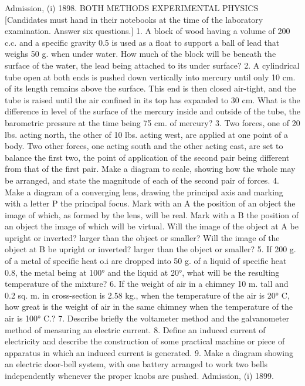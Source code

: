 Admission, (i) 1898.
BOTH METHODS EXPERIMENTAL PHYSICS
[Candidates must hand in their notebooks at the time of the laboratory examination. Answer six questions.]
1. A block of wood having a volume of 200 c.c. and a specific gravity 0.5 is used as a float to support a ball of lead that weighs 50 g. when under water. How much of the block will be beneath the surface of the water, the lead being attached to its under surface?
2. A cylindrical tube open at both ends is pushed down vertically into mercury until only 10 cm. of its length remains above the surface. This end is then closed air-tight, and the tube is raised until the air confined in its top has expanded to 30 cm. What is the difference in level of the surface of the mercury inside and outside of the tube, the barometric pressure at the time being 75 cm. of mercury?
3. Two forces, one of 20 lbs. acting north, the other of 10 lbs. acting west, are applied at one point of a body. Two other forces, one acting south and the other acting east, are set to balance the first two, the point of application of the second pair being different from that of the first pair. Make a diagram to scale, showing how the whole may be arranged, and state the magnitude of each of the second pair of forces.
4. Make a diagram of a converging lens, drawing the principal axis and marking with a letter P the principal focus. Mark with an A the position of an object the image of which, as formed by the lens, will be real. Mark with a B the position of an object the image of which will be virtual. Will the image of the object at A be upright or inverted? larger than the object or smaller? Will the image of the object at B be upright or inverted? larger than the object or smaller?
5. If 200 g. of a metal of specific heat o.i are dropped into 50 g. of a liquid of specific heat 0.8, the metal being at 100° and the liquid at 20°, what will be the resulting temperature of the mixture?
6. If the weight of air in a chimney 10 m. tall and 0.2 sq. m. in cross-section is 2.58 kg., when the temperature of the air is 20° C, how great is the weight of air in the same chimney when the temperature of the air is 100° C.?
7. Describe briefly the voltameter method and the galvanometer method of measuring an electric current.
8. Define an induced current of electricity and describe the construction of some practical machine or piece of apparatus in which an induced current is generated.
9. Make a diagram showing an electric door-bell system, with one battery arranged to work two bells independently whenever the proper knobs are pushed.
Admission, (i) 1899.
